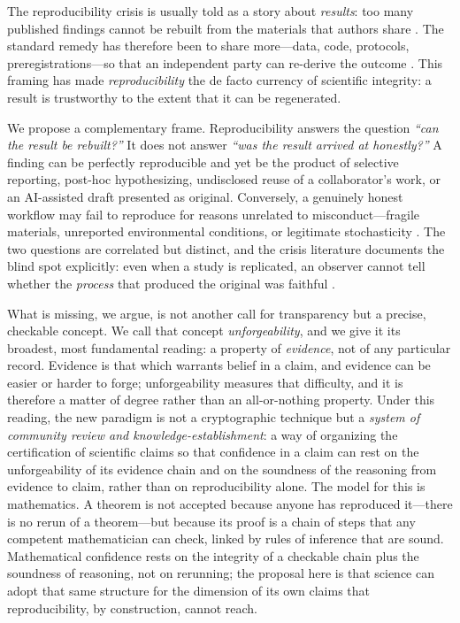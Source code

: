 \documentclass[11pt]{article}
\begin{document}
The reproducibility crisis is usually told as a story about \emph{results}: too many
published findings cannot be rebuilt from the materials that authors share
\parencite{nosek2015top,donoho2009}. The standard remedy has therefore been to share
more---data, code, protocols, preregistrations---so that an independent party can
re-derive the outcome \parencite{nosek2015top,donoho2009}. This framing has made
\emph{reproducibility} the de facto currency of scientific integrity: a result is
trustworthy to the extent that it can be regenerated.

We propose a complementary frame. Reproducibility answers the question
\textit{``can the result be rebuilt?''} It does not answer \textit{``was the result
arrived at honestly?''} A finding can be perfectly reproducible and yet be the product
of selective reporting, post-hoc hypothesizing, undisclosed reuse of a collaborator's
work, or an AI-assisted draft presented as original. Conversely, a genuinely honest
workflow may fail to reproduce for reasons unrelated to misconduct---fragile materials,
unreported environmental conditions, or legitimate stochasticity \parencite{ioannidis2005}.
The two questions are correlated but distinct, and the crisis literature documents the
blind spot explicitly: even when a study is replicated, an observer cannot tell whether
the \emph{process} that produced the original was faithful \parencite{john2012,fanelli2009}.

What is missing, we argue, is not another call for transparency but a precise,
checkable concept. We call that concept \emph{unforgeability}, and we give it its
broadest, most fundamental reading: a property of \emph{evidence}, not of any particular
record. Evidence is that which warrants belief in a claim, and evidence can be easier or
harder to forge; unforgeability measures that difficulty, and it is therefore a matter
of degree rather than an all-or-nothing property. Under this reading, the new paradigm
is not a cryptographic technique but a \emph{system of community review and
knowledge-establishment}: a way of organizing the certification of scientific claims so
that confidence in a claim can rest on the unforgeability of its evidence chain and on
the soundness of the reasoning from evidence to claim, rather than on reproducibility
alone. The model for this is mathematics. A theorem is not accepted because anyone has
reproduced it---there is no rerun of a theorem---but because its proof is a chain of
steps that any competent mathematician can check, linked by rules of inference that are
sound. Mathematical confidence rests on the integrity of a checkable chain plus the
soundness of reasoning, not on rerunning; the proposal here is that science can adopt
that same structure for the dimension of its own claims that reproducibility, by
construction, cannot reach.
\end{document}
